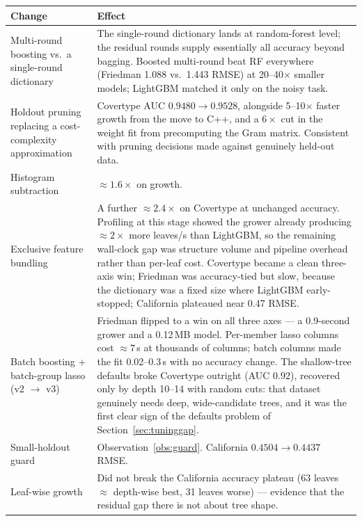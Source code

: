 \documentclass[11pt,a4paper]{article}
\theoremstyle{definition}
\begin{document}
\begin{center}
\begin{tabular}{p{}p{}}
\toprule
Change & Effect \\
\midrule
Multi-round boosting vs.\ a single-round dictionary
& The single-round dictionary lands at random-forest level; the residual rounds
supply essentially all accuracy beyond bagging. Boosted multi-round beat RF
everywhere (Friedman 1.088 vs.\ 1.443 RMSE) at 20--40$\times$ smaller models;
LightGBM matched it only on the noisy task. \\
\addlinespace
Holdout pruning replacing a cost-complexity approximation
& Covertype AUC $0.9480 \to 0.9528$, alongside 5--10$\times$ faster growth from
the move to C++, and a $6\times$ cut in the weight fit from precomputing the
Gram matrix. Consistent with pruning decisions made against genuinely held-out
data. \\
\addlinespace
Histogram subtraction
& $\approx 1.6\times$ on growth. \\
\addlinespace
Exclusive feature bundling
& A further $\approx 2.4\times$ on Covertype at unchanged accuracy. Profiling at
this stage showed the grower already producing $\approx 2\times$ more leaves/s
than LightGBM, so the remaining wall-clock gap was structure volume and pipeline
overhead rather than per-leaf cost. Covertype became a clean three-axis win;
Friedman was accuracy-tied but slow, because the dictionary was a fixed size
where LightGBM early-stopped; California plateaued near 0.47 RMSE. \\
\addlinespace
Batch boosting + batch-group lasso (v2 $\to$ v3)
& Friedman flipped to a win on all three axes --- a 0.9-second grower and a
0.12\,MB model. Per-member lasso columns cost
$\approx 7$\,s at thousands of columns; batch columns made the fit
0.02--0.3\,s with no accuracy change. The shallow-tree defaults broke Covertype
outright (AUC 0.92), recovered only by depth 10--14 with random cuts: that
dataset genuinely needs deep, wide-candidate trees, and it was the first clear
sign of the defaults problem of Section~\ref{sec:tuninggap}. \\
\addlinespace
Small-holdout guard
& Observation~\ref{obs:guard}. California $0.4504 \to 0.4437$ RMSE. \\
\addlinespace
Leaf-wise growth
& Did not break the California accuracy plateau (63 leaves $\approx$ depth-wise
best, 31 leaves worse) --- evidence that the residual gap there is not about
tree shape. \\
\bottomrule
\end{tabular}
\end{center}
\end{document}
